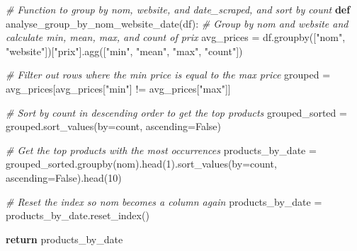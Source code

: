 \documentclass[
]{article}
\newenvironment{Shaded}{}{}
\newcommand{\CommentTok}[1]{\textcolor[rgb]{0.38,0.63,0.69}{\textit{#1}}}
\newcommand{\ControlFlowTok}[1]{\textcolor[rgb]{0.00,0.44,0.13}{\textbf{#1}}}
\newcommand{\DecValTok}[1]{\textcolor[rgb]{0.25,0.63,0.44}{#1}}
\newcommand{\KeywordTok}[1]{\textcolor[rgb]{0.00,0.44,0.13}{\textbf{#1}}}
\newcommand{\NormalTok}[1]{#1}
\newcommand{\OperatorTok}[1]{\textcolor[rgb]{0.40,0.40,0.40}{#1}}
\newcommand{\StringTok}[1]{\textcolor[rgb]{0.25,0.44,0.63}{#1}}
\newcommand{\VariableTok}[1]{\textcolor[rgb]{0.10,0.09,0.49}{#1}}
\begin{document}
\hypertarget{8861013f-5892-4101-b651-f50eececc488}{}
\begin{Shaded}
\begin{Highlighting}[]
\CommentTok{\# Function to group by \textquotesingle{}nom\textquotesingle{}, \textquotesingle{}website\textquotesingle{}, and \textquotesingle{}date\_scraped\textquotesingle{}, and sort by count}
\KeywordTok{def}\NormalTok{ analyse\_group\_by\_nom\_website\_date(df):}
    \CommentTok{\# Group by \textquotesingle{}nom\textquotesingle{} and \textquotesingle{}website\textquotesingle{} and calculate min, mean, max, and count of \textquotesingle{}prix\textquotesingle{}}
\NormalTok{    avg\_prices }\OperatorTok{=}\NormalTok{ df.groupby([}\StringTok{"nom"}\NormalTok{, }\StringTok{"website"}\NormalTok{])[}\StringTok{"prix"}\NormalTok{].agg([}\StringTok{"min"}\NormalTok{, }\StringTok{"mean"}\NormalTok{, }\StringTok{"max"}\NormalTok{, }\StringTok{"count"}\NormalTok{])}

    \CommentTok{\# Filter out rows where the min price is equal to the max price}
\NormalTok{    grouped }\OperatorTok{=}\NormalTok{ avg\_prices[avg\_prices[}\StringTok{"min"}\NormalTok{] }\OperatorTok{!=}\NormalTok{ avg\_prices[}\StringTok{"max"}\NormalTok{]]}

    \CommentTok{\# Sort by \textquotesingle{}count\textquotesingle{} in descending order to get the top products}
\NormalTok{    grouped\_sorted }\OperatorTok{=}\NormalTok{ grouped.sort\_values(by}\OperatorTok{=}\StringTok{\textquotesingle{}count\textquotesingle{}}\NormalTok{, ascending}\OperatorTok{=}\VariableTok{False}\NormalTok{)}

    \CommentTok{\# Get the top products with the most occurrences}
\NormalTok{    products\_by\_date }\OperatorTok{=}\NormalTok{ grouped\_sorted.groupby(}\StringTok{\textquotesingle{}nom\textquotesingle{}}\NormalTok{).head(}\DecValTok{1}\NormalTok{).sort\_values(by}\OperatorTok{=}\StringTok{\textquotesingle{}count\textquotesingle{}}\NormalTok{, ascending}\OperatorTok{=}\VariableTok{False}\NormalTok{).head(}\DecValTok{10}\NormalTok{)}

    \CommentTok{\# Reset the index so \textquotesingle{}nom\textquotesingle{} becomes a column again}
\NormalTok{    products\_by\_date }\OperatorTok{=}\NormalTok{ products\_by\_date.reset\_index()}

    \ControlFlowTok{return}\NormalTok{ products\_by\_date}
\end{Highlighting}
\end{Shaded}
\end{document}
